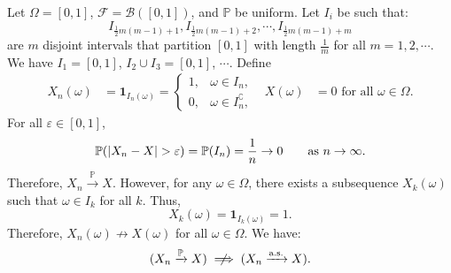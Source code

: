 \documentclass{huhtakm-template-book-v2}
\newcommand{\prob}{\mathbb{P}}
\begin{document}
    \begin{eg}
        \label{Chapter 8 (Example) Convergence in probability does not imply almost sure convergence}
        Let $\Omega = [0,1]$, $\mathcal{F} = \mathcal{B}([0,1])$, and $\prob$ be uniform. 
        Let $I_{i}$ be such that:
        \begin{equation*}
            I_{\frac{1}{2}m(m-1)+1}, I_{\frac{1}{2}m(m-1)+2}, \cdots, I_{\frac{1}{2}m(m-1)+m}
        \end{equation*} 
        are $m$ disjoint intervals that partition $[0,1]$ with length $\frac{1}{m}$ for all $m = 1,2,\cdots$. We have $I_{1} = [0,1]$, $I_{2}\cup I_{3} = [0,1]$, $\cdots$. Define
        \begin{align*}
            X_{n}(\omega) &= \mathbf{1}_{I_{n}(\omega)} = \begin{cases}
                1, &\omega \in I_{n},\\
                0, &\omega \in I_{n}^{\complement},
            \end{cases} & X(\omega) &= 0 \text{ for all } \omega \in \Omega.
        \end{align*}
        For all $\varepsilon \in [0,1]$,
        \begin{equation*}
            \prob(\abs{X_{n}-X} > \varepsilon) = \prob(I_{n}) = \frac{1}{n} \to 0 \qquad \text{as } n \to \infty.
        \end{equation*}
        Therefore, $X_{n} \xrightarrow{\prob} X$. However, for any $\omega \in \Omega$, there exists a subsequence $X_{k}(\omega)$ such that $\omega \in I_{k}$ for all $k$. Thus,
        \begin{equation*}
            X_{k}(\omega) = \mathbf{1}_{I_{k}(\omega)} = 1.
        \end{equation*}
        Therefore, $X_{n}(\omega) \not\to X(\omega)$ for all $\omega \in \Omega$. We have:
        \begin{equation*}
            (X_{n} \xrightarrow{\prob} X) \centernot\implies (X_{n} \xrightarrow{\text{a.s.}} X).
        \end{equation*}
    \end{eg}
    \newpage
\end{document}
